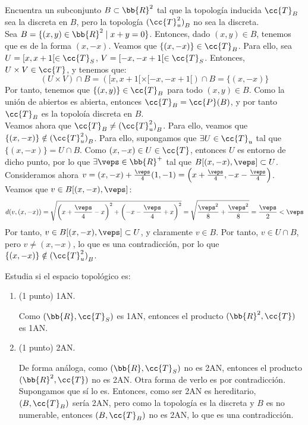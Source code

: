 \documentclass[12pt]{article}
\newcommand{\T}[0]{\cc{T}}
\begin{document}
    \begin{ejercicio}[1.5 puntos]
        Encuentra un subconjunto $B\subset \bb{R}^2$ tal que la topología inducida $\T_{B}$ sea la discreta en $B$, pero la topología ${(\T_u^2)}_B$ no sea la discreta.\\

        Sea $B=\{(x,y)\in \bb{R}^2\mid x+y=0\}$. Entonces, dado $(x,y)\in B$, tenemos que es de la forma $(x,-x)$. Veamos que $\{(x,-x)\}\in \T_B$. Para ello, sea $U=[x,x+1[\in \T_S$, $V=[-x,-x+1[\in \T_S$.
        Entonces, $U\times V\in \T$, y tenemos que:
        \begin{equation*}
            (U\times V)\cap B = \left( [x,x+1[\times [-x,-x+1[\right) \cap B = \{(x,-x)\}
        \end{equation*}
        Por tanto, tenemos que $\{(x,y)\}\in \T_B$ para todo $(x,y)\in B$. Como la unión de abiertos es abierta, entonces $\T_B=\cc{P}(B)$,
        y por tanto $\T_B$ es la topoloía discreta en $B$.\\

        Veamos ahora que $\T_{B}\neq {(\T_u^2)}_B$. Para ello, veamos que $\{(x,-x)\}\notin {(\T_u^2)}_B$. Para ello, supongamos que $\exists U\in \T_u$ tal que
        $\{(x,-x)\}=U\cap B$. Como $(x,-x)\in U\in \T$, entonces $U$ es entorno de dicho punto, por lo que $\exists \veps\in \bb{R}^+$ tal que $B[(x,-x),\veps]\subset U$.
        Consideramos ahora $v=(x,-x)+\frac{\veps}{4}(1,-1) = \left(x+\frac{\veps}{4}, -x-\frac{\veps}{4}\right)$. Veamos que $v\in B[(x,-x),\veps]$:
        \begin{equation*}
            d(v,(x,-x)) = \sqrt{\left(x+\frac{\veps}{4}-x\right)^2 + \left(-x-\frac{\veps}{4}+x\right)^2}
            = \sqrt{\frac{\veps^2}{8}+\frac{\veps^2}{8}} = \frac{\veps}{2} < \veps
        \end{equation*}
        Por tanto, $v\in B[(x,-x),\veps]\subset U$, y claramente $v\in B$. Por tanto, $v\in U\cap B$, pero $v\neq (x,-x)$, lo que es una contradicción, por lo que
        $\{(x,-x)\}\notin {(\T_u^2)}_B$.
    \end{ejercicio}

    \begin{ejercicio}
        Estudia si el espacio topológico es:
        \begin{enumerate}
            \item (1 punto) 1AN.
            
            Como $(\bb{R},\T_S)$ es 1AN, entonces el producto $(\bb{R}^2,\T)$ es 1AN.
            \item (1 punto) 2AN.
            
            De forma análoga, como $(\bb{R},\T_S)$ no es 2AN, entonces el producto $(\bb{R}^2,\T)$ no es 2AN. Otra forma de verlo es por contradicción.
            Supongamos que sí lo es. Entonces, como ser 2AN es hereditario, $(B, \T_B)$ sería 2AN, pero como la topología es la discreta y $B$ es no numerable,
            entonces $(B, \T_B)$ no es 2AN, lo que es una contradicción.
        \end{enumerate}
    \end{ejercicio}
\end{document}
